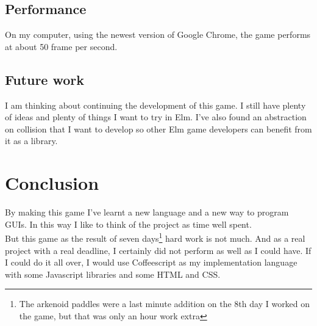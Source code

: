 \documentclass[a4paper]{article}
\begin{document}
\subsection{Performance}
On my computer, using the newest version of Google Chrome, the game performs at
 about 50 frame per second. 

\subsection{Future work}
I am thinking about continuing the development of this game. I still have
 plenty of ideas and plenty of things I want to try in Elm. I've also found
 an abstraction on collision that I want to develop so other Elm game
 developers can benefit from it as a library. 

\section{Conclusion}
By making this game I've learnt a new language and a new way to program GUIs. In
 this way I like to think of the project as time well spent. \\
But this game as the result of seven days\footnote{The arkenoid paddles were a
  last minute addition on the 8th day I worked on the game, but that was only an
  hour work extra} hard work is not much. And as a real project with a real
 deadline, I certainly did not perform as well as I could have. If I could do
 it all over, I would use Coffeescript as my implementation language with some
 Javascript libraries and some HTML and CSS.
 

\newpage




\end{document}

